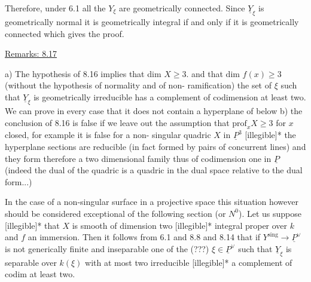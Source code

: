 
Therefore, under 6.1 all the $Y_\xi$ are geometrically connected.
Since $\underline{Y}_\xi$ is geometrically normal it is geometrically integral if
and only if it is geometrically connected which gives the proof.

\uline{Remarks: 8.17}

a) The hypothesis of 8.16 implies that dim $X \geq 3$. and that
dim $f(x) \geq 3$ (without the hypothesis of normality and of non-%
ramification) the set of $\xi$ such that $\underline{Y}_\xi$ is geometrically
irreducible has a complement of codimension at least two. We can
prove in every case that it does not contain a hyperplane of below
b) the conclusion of 8.16 is false if we leave out the assumption
that $\mathrm{prof}_x X \geq 3$ for $x$ closed, for example it is false for a non-%
singular quadric $X$ in $\underline{P}^3$ [illegible]*
the hyperplane sections are reducible (in fact formed by pairs of
concurrent lines) and they form therefore a two dimensional family
thus of codimension one in $\underline{P}$ (indeed the dual of the quadric is a
quadric in the dual space relative to the dual form...)

In the case of a non-singular surface in a projective space
this situation however should be considered exceptional of the
following section (or $N^0$). Let us suppose [illegible]* that $X$ is
smooth of dimension two [illegible]* integral proper over $k$ and $f$
an immersion. Then it follows from 6.1 and 8.8 and 8.14 that if
$Y^{\mathrm{sing}} \to \underline{P}^\vee$ is not generically finite and inseparable one of the
(???) $\xi \in \underline{P}^\vee$ such that $\underline{Y}_\xi$ is separable over $k(\xi)$ with at most two
irreducible [illegible]* a complement of codim at least two.


